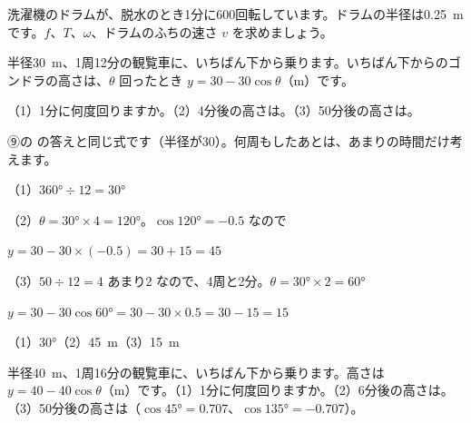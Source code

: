 \begin{jibun}
洗濯機のドラムが、脱水のとき1分に600回転しています。ドラムの半径は\qty{0.25}{m}です。$f$、$T$、$\omega$、ドラムのふちの速さ $v$ を求めましょう。
\end{jibun}

\begin{reidai}[観覧車の高さ]
半径\qty{30}{m}、1周12分の観覧車に、いちばん下から乗ります。いちばん下からのゴンドラの高さは、$\theta$ 回ったとき $y=30-30\cos\theta$（m）です。\par
（1）1分に何度回りますか。\quad（2）4分後の高さは。\quad（3）50分後の高さは。\par
\kangaekata ⑨の \bkhatenaref の答えと同じ式です（半径が30）。何周もしたあとは、あまりの時間だけ考えます。\par
\shiki{}\zw{} （1）$360°\div12=30°$\par
\bkiviq （2）$\theta=30°\times4=120°$。$\cos120°=-0.5$ なので\par
\bkivib $y=30-30\times(-0.5)=30+15=45$\par
\bkiviq （3）$50\div12=4$ あまり2 なので、4周と2分。$\theta=30°\times2=60°$\par
\bkivib $y=30-30\cos60°=30-30\times0.5=30-15=15$\par
\kotae{}\zw{} （1）30°\quad（2）\qty{45}{m}\quad（3）\qty{15}{m}
\end{reidai}



\begin{jibun}
半径\qty{40}{m}、1周16分の観覧車に、いちばん下から乗ります。高さは $y=40-40\cos\theta$（m）です。（1）1分に何度回りますか。（2）6分後の高さは。（3）50分後の高さは（$\cos45°=0.707$、$\cos135°=-0.707$）。
\end{jibun}


